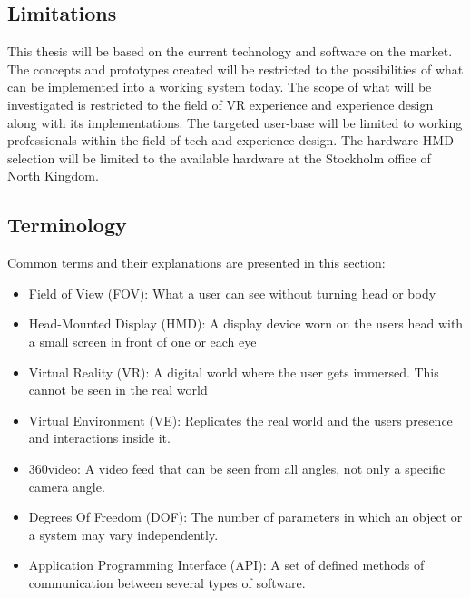 \subsection{Limitations}
This thesis will be based on the current technology and software on the market. The concepts and prototypes created will be restricted to the possibilities of what can be implemented into a working system today. The scope of what will be investigated is restricted to the field of VR experience and experience design along with its implementations. The targeted user-base will be limited to working professionals within the field of tech and experience design. The hardware HMD selection will be limited to the available hardware at the Stockholm office of North Kingdom.

\subsection{Terminology}
  Common terms and their explanations are presented in this section:
  \begin{itemize}
		\item Field of View (FOV): What a user can see without turning head or body
	  \item Head-Mounted Display (HMD): A display device worn on the users head with a small screen in front of one or each eye
	  \item Virtual Reality (VR): A digital world where the user gets immersed. This cannot be seen in the real world
		\item Virtual Environment (VE): Replicates the real world and the users presence and interactions inside it.
	  \item 360\degree video: A video feed that can be seen from all angles, not only a specific camera angle.
		\item Degrees Of Freedom (DOF): The number of parameters in which an object or a system may vary independently.
		\item Application Programming Interface (API): A set of defined methods of communication between several types of software.
	\end{itemize}
